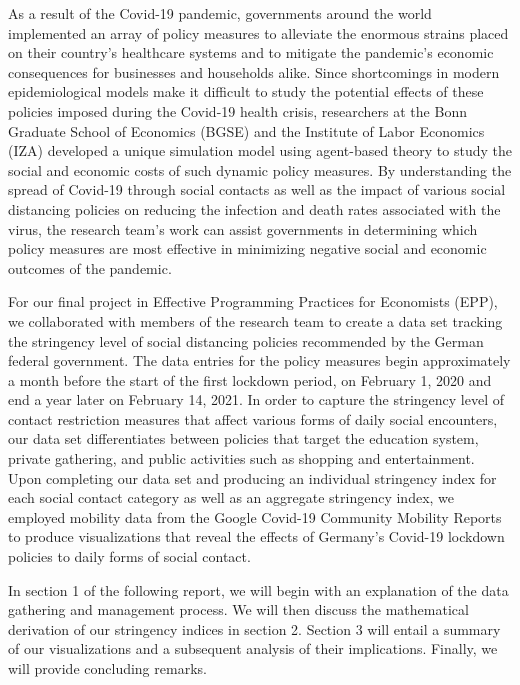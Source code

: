 As a result of the Covid-19 pandemic, governments around the world implemented an array of policy measures to alleviate the enormous strains placed on their country’s healthcare systems and to mitigate the pandemic’s economic consequences for businesses and households alike. Since shortcomings in modern epidemiological models make it difficult to study the potential effects of these policies imposed during the Covid-19 health crisis, researchers at the Bonn Graduate School of Economics (BGSE) and the Institute of Labor Economics (IZA) developed a unique simulation model using agent-based theory to study the social and economic costs of such dynamic policy measures. By understanding the spread of Covid-19 through social contacts as well as the impact of various social distancing policies on reducing the infection and death rates associated with the virus, the research team’s work can assist governments in determining which policy measures are most effective in minimizing negative social and economic outcomes of the pandemic.

For our final project in Effective Programming Practices for Economists (EPP), we collaborated with members of the research team to create a data set tracking the stringency level of social distancing policies recommended by the German federal government. The data entries for the policy measures begin approximately a month before the start of the first lockdown period, on February 1, 2020 and end a year later on February 14, 2021. In order to capture the stringency level of contact restriction measures that affect various forms of daily social encounters, our data set differentiates between policies that target the education system, private gathering, and public activities such as shopping and entertainment. Upon completing our data set and producing an individual stringency index for each social contact category as well as an aggregate stringency index, we employed mobility data from the Google Covid-19 Community Mobility Reports to produce visualizations that reveal the effects of Germany’s Covid-19 lockdown policies to daily forms of social contact.

In section 1 of the following report, we will begin with an explanation of the data gathering and management process. We will then discuss the mathematical derivation of our stringency indices in section 2. Section 3 will entail a summary of our visualizations and a subsequent analysis of their implications. Finally, we will provide concluding remarks.